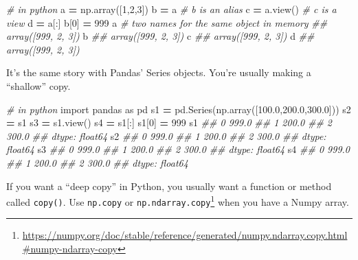 \documentclass[
  12pt,
]{krantz}
\makeatletter
\newenvironment{Shaded}{\begin{snugshade}}{\end{snugshade}}
\newcommand{\CommentTok}[1]{\textcolor[rgb]{0.37,0.37,0.37}{\textit{#1}}}
\newcommand{\DecValTok}[1]{\textcolor[rgb]{0.06,0.06,0.06}{#1}}
\newcommand{\FloatTok}[1]{\textcolor[rgb]{0.06,0.06,0.06}{#1}}
\newcommand{\ImportTok}[1]{#1}
\newcommand{\NormalTok}[1]{#1}
\newcommand{\OperatorTok}[1]{\textcolor[rgb]{0.43,0.43,0.43}{\textbf{#1}}}
\renewcommand{\href}[2]{#2\footnote{\url{#1}}}
\newenvironment{kframe}{%
\medskip{}
\setlength{\fboxsep}{.8em}
 \def\at@end@of@kframe{}%
 \ifinner\ifhmode%
  \def\at@end@of@kframe{\end{minipage}}%
  \begin{minipage}{\columnwidth}%
 \fi\fi%
 \def\FrameCommand##1{\hskip\@totalleftmargin \hskip-\fboxsep
 \colorbox{shadecolor}{##1}\hskip-\fboxsep
     \hskip-\linewidth \hskip-\@totalleftmargin \hskip\columnwidth}%
 \MakeFramed {\advance\hsize-\width
   \@totalleftmargin\z@ \linewidth\hsize
   \@setminipage}}%
 {\par\unskip\endMakeFramed%
 \at@end@of@kframe}
\renewenvironment{Shaded}{\begin{kframe}}{\end{kframe}}
\makeatother
\begin{document}
\begin{Shaded}
\begin{Highlighting}[]
\CommentTok{\# in python}
\NormalTok{a }\OperatorTok{=}\NormalTok{ np.array([}\DecValTok{1}\NormalTok{,}\DecValTok{2}\NormalTok{,}\DecValTok{3}\NormalTok{])}
\NormalTok{b }\OperatorTok{=}\NormalTok{ a }\CommentTok{\# b is an alias}
\NormalTok{c }\OperatorTok{=}\NormalTok{ a.view() }\CommentTok{\# c is a view}
\NormalTok{d }\OperatorTok{=}\NormalTok{ a[:]}
\NormalTok{b[}\DecValTok{0}\NormalTok{] }\OperatorTok{=} \DecValTok{999}
\NormalTok{a }\CommentTok{\# two names for the same object in memory}
\CommentTok{\#\# array([999,   2,   3])}
\NormalTok{b}
\CommentTok{\#\# array([999,   2,   3])}
\NormalTok{c}
\CommentTok{\#\# array([999,   2,   3])}
\NormalTok{d}
\CommentTok{\#\# array([999,   2,   3])}
\end{Highlighting}
\end{Shaded}

It's the same story with Pandas' Series objects. You're usually making a ``shallow'' copy.

\begin{Shaded}
\begin{Highlighting}[]
\CommentTok{\# in python}
\ImportTok{import}\NormalTok{ pandas }\ImportTok{as}\NormalTok{ pd}
\NormalTok{s1 }\OperatorTok{=}\NormalTok{ pd.Series(np.array([}\FloatTok{100.0}\NormalTok{,}\FloatTok{200.0}\NormalTok{,}\FloatTok{300.0}\NormalTok{]))}
\NormalTok{s2 }\OperatorTok{=}\NormalTok{ s1}
\NormalTok{s3 }\OperatorTok{=}\NormalTok{ s1.view()}
\NormalTok{s4 }\OperatorTok{=}\NormalTok{ s1[:]}
\NormalTok{s1[}\DecValTok{0}\NormalTok{] }\OperatorTok{=} \DecValTok{999}
\NormalTok{s1}
\CommentTok{\#\# 0    999.0}
\CommentTok{\#\# 1    200.0}
\CommentTok{\#\# 2    300.0}
\CommentTok{\#\# dtype: float64}
\NormalTok{s2}
\CommentTok{\#\# 0    999.0}
\CommentTok{\#\# 1    200.0}
\CommentTok{\#\# 2    300.0}
\CommentTok{\#\# dtype: float64}
\NormalTok{s3}
\CommentTok{\#\# 0    999.0}
\CommentTok{\#\# 1    200.0}
\CommentTok{\#\# 2    300.0}
\CommentTok{\#\# dtype: float64}
\NormalTok{s4}
\CommentTok{\#\# 0    999.0}
\CommentTok{\#\# 1    200.0}
\CommentTok{\#\# 2    300.0}
\CommentTok{\#\# dtype: float64}
\end{Highlighting}
\end{Shaded}

If you want a ``deep copy'' in Python, you usually want a function or method called \texttt{copy()}. Use \texttt{np.copy} or \href{https://numpy.org/doc/stable/reference/generated/numpy.ndarray.copy.html\#numpy-ndarray-copy}{\texttt{np.ndarray.copy}} when you have a Numpy array.
\end{document}
